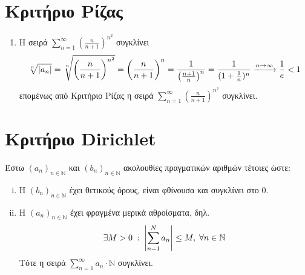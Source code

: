 \section{Κριτήριο Ρίζας}


\begin{examples}
\item {}
    \begin{enumerate}
        \item Η σειρά $ \sum_{n=1}^{\infty} \left(\frac{n}{n+1} \right)^{n^{2}} $ 
            συγκλίνει
            \[
                \sqrt[n]{\abs{a_{n}}} = \sqrt[n]{\left(\frac{n}{n+1} \right)^{n^{2}}} 
                = \left(\frac{n}{n+1}\right)^{n} = \frac{1}{\left(\frac{n+1}{n} 
                \right)^{n}} = \frac{1}{(1+ \frac{1}{n})^{n}} \xrightarrow{n \to \infty}
                \frac{1}{e} <1
            \] 
            επομένως από Κριτήριο Ρίζας η σειρά 
            $ \sum_{n=1}^{\infty} \left(\frac{n}{n+1} \right)^{n^{2}} $ συγκλίνει.
    \end{enumerate}
\end{examples}

\section{Κριτήριο Dirichlet}

Έστω $ {(a_{n})}_{n \in \mathbb{N}} $ και $ (b_{n})_{n \in \mathbb{N}} $ ακολουθίες 
πραγματικών αριθμών τέτοιες ώστε:
\begin{enumerate}[i)]
    \item Η $ (b_{n})_{n \in \mathbb{N}} $ έχει θετικούς όρους, είναι φθίνουσα και 
        συγκλίνει στο 0.
    \item Η $ {(a_{n})}_{n \in \mathbb{N}} $ έχει φραγμένα μερικά αθροίσματα, δηλ.
        \[
            \exists M>0 \; : \; \abs{\sum_{n=1}^{N} a_{n}} \leq M, \; 
            \forall n \in \mathbb{N} 
        \] 
        Τότε η σειρά $ \sum_{n=1}^{\infty} a_{n}\cdot \mathbb{N} $ συγκλίνει.
\end{enumerate}


